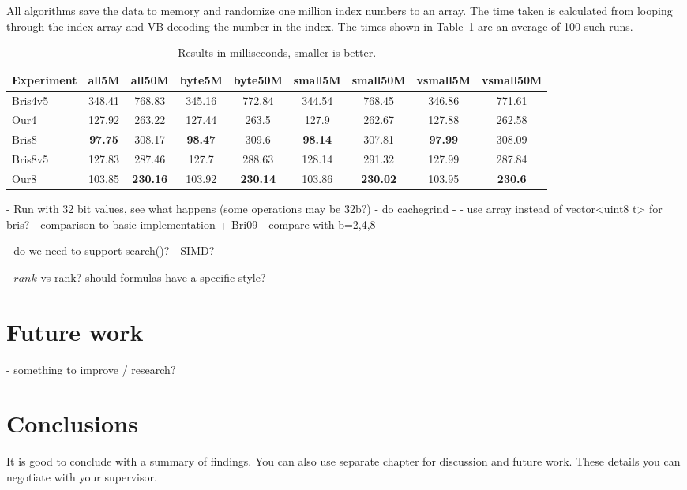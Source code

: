 All algorithms save the data to memory and randomize one million index numbers to an array. The time taken is calculated from looping through the 
index array and VB decoding the number in the index. The times shown in Table~\ref{table:results1} are an average of 100 such runs.

\begin{table}
\centering
\caption{Results in milliseconds, smaller is better.\label{table:results1}}
\begin{tabular}{l||c c c c c c c c} 
Experiment & all5M & all50M & byte5M & byte50M & small5M & small50M & vsmall5M & vsmall50M\\ 
\hline \hline 
Bris4v5 & 348.41 & 768.83 & 345.16 & 772.84 & 344.54 & 768.45 & 346.86 & 771.61 \\
Our4    & 127.92 & 263.22 & 127.44 & 263.5  & 127.9  & 262.67 & 127.88 & 262.58 \\
Bris8   & \textbf{97.75}  & 308.17 & \textbf{98.47}  & 309.6  & \textbf{98.14}  & 307.81 & \textbf{97.99}  & 308.09 \\
Bris8v5 & 127.83 & 287.46 & 127.7  & 288.63 & 128.14 & 291.32 & 127.99 & 287.84 \\
Our8    & 103.85 & \textbf{230.16} & 103.92 & \textbf{230.14} & 103.86 & \textbf{230.02} & 103.95 & \textbf{230.6} \\

\hline
%
\end{tabular}
\end{table}



 - Run with 32 bit values, see what happens (some operations may be 32b?)
 - do cachegrind
 - 
 - use array instead of vector<uint8 t> for bris?
- comparison to basic implementation + Bri09
  - compare with b=2,4,8

 - do we need to support search()?
 - SIMD?

 - $rank$ vs rank? should formulas have a specific style?

\chapter{Future work}
 - something to improve / research?

\chapter{Conclusions\label{chapter:conclusions}}

It is good to conclude with a summary of findings. You can also use separate chapter for discussion and future work. These details you can negotiate with your supervisor.

